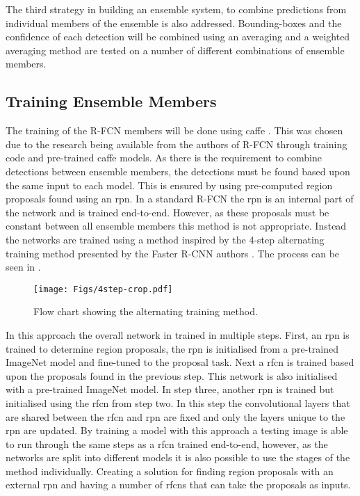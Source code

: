 \documentclass[a4paper,twoside]{article}
\begin{document}
The third strategy in building an ensemble system, to combine predictions from individual members of the ensemble is also addressed. Bounding-boxes and the confidence of each detection will be combined using an averaging and a weighted averaging method are tested on a number of different combinations of ensemble members.

\subsection{Training Ensemble Members}\label{sec:trainens}
The training of the R-FCN members will be done using \gls{caffe} \cite{caffe}. This was chosen due to the research being available from the authors of R-FCN through training code and pre-trained \gls{caffe} models. As there is the requirement to combine detections between ensemble members, the detections must be found based upon the same input to each model. This is ensured by using pre-computed region proposals found using an \gls{rpn}. In a standard R-FCN the \gls{rpn} is an internal part of the network and is trained end-to-end. However, as these proposals must be constant between all ensemble members this method is not appropriate. Instead the networks are trained using a method inspired by the 4-step alternating training method presented by the Faster R-CNN authors \cite{fasterrcnn}. The process can be seen in .

 \begin{figure}[!h]
  \centering
    \texttt{[image: Figs/4step-crop.pdf]}
      \caption{Flow chart showing the alternating training method.}
    \label{fig:4steptrain}
\end{figure}

In this approach the overall network in trained in multiple steps. First, an \gls{rpn} is trained to determine region proposals, the \gls{rpn} is initialised from a pre-trained ImageNet model and fine-tuned to the proposal task. Next a \gls{rfcn} is trained based upon the proposals found in the previous step. This network is also initialised with a pre-trained ImageNet model. In step three, another \gls{rpn} is trained but initialised using the \gls{rfcn} from step two. In this step the convolutional layers that are shared between the \gls{rfcn} and \gls{rpn} are fixed and only the layers unique to the \gls{rpn} are updated. By training a model with this approach a testing image is able to run through the same steps as a \gls{rfcn} trained end-to-end, however, as the networks are split into different models it is also possible to use the stages of the method individually. Creating a solution for finding region proposals with an external \gls{rpn} and having a number of \glspl{rfcn} that can take the proposals as inputs. 
\end{document}
